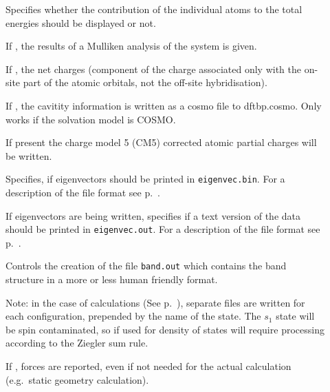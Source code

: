 \begin{description}

\item[] Specifies whether the contribution of the
  individual atoms to the total energies should be displayed or not.

\item[] If , the results of a Mulliken analysis of
  the system is given.

\item[] If , the net charges (component of the
  charge associated only with the on-site part of the atomic orbitals, not the
  off-site hybridisation).

\item[] If , the cavitity information is written as
  a cosmo file to dftbp.cosmo. Only works if the solvation model is COSMO.

\item[] If present the charge model 5 (CM5)\cite{marenich2012} corrected
  atomic partial charges will be written.

\item[] Specifies, if eigenvectors should be printed in
  \verb|eigenvec.bin|. For a description of the file format see
  p.~.

\item[] If eigenvectors are being written, specifies if a
  text version of the data should be printed in \verb|eigenvec.out|. For a
  description of the file format see p.~.

\item[] Controls the creation of the file
  \verb|band.out| which contains the band structure in a more or less
  human friendly format.

  Note: in the case of  calculations (See
  p.~), separate files are written for each
  configuration, prepended by the name of the state. The $s_1$ state
  will be spin contaminated, so if used for density of states will
  require processing according to the Ziegler sum
  rule.\cite{baerends-TCA-43-261}

\item[] If , forces are reported, even if not needed
  for the actual calculation (e.g.\ static geometry calculation).

\end{description}

